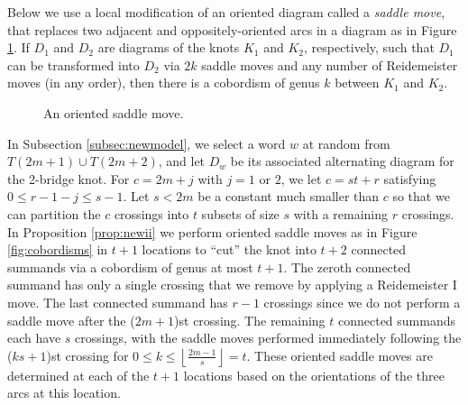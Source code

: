 \documentclass[12pt]{amsart}
\theoremstyle{definition}
\theoremstyle{remark}
\numberwithin{equation}{section}
\begin{document}
Below we use a local modification of an oriented diagram called a \textit{saddle move}, that replaces two adjacent and oppositely-oriented arcs in a diagram as in Figure \ref{fig:saddle}. If $D_1$ and $D_2$ are diagrams of the knots $K_1$ and $K_2$, respectively, such that $D_1$ can be transformed into $D_2$ via $2k$ saddle moves and any number of Reidemeister moves (in any order), then there is a cobordism of genus $k$ between $K_1$ and $K_2$.
\begin{figure}[h!]
\caption{An oriented saddle move.}
\label{fig:saddle}
\end{figure}





In Subsection \ref{subsec:newmodel}, we select a word $w$ at random from $T(2m+1)\cup T(2m+2)$, and let $D_w$ be its associated alternating diagram for the 2-bridge knot.  For $c=2m+j$ with $j=1$ or $2$, we let $c=st+r$ satisfying $0\leq r-1-j\leq s-1$.  Let $s<2m$ be a constant much smaller than $c$ so that we can partition the $c$ crossings into $t$ subsets of size $s$ with a remaining $r$ crossings.  In Proposition \ref{prop:newii} we perform oriented saddle moves as in Figure \ref{fig:cobordisms} in $t+1$ locations to ``cut'' the knot into $t+2$ connected summands via a cobordism of genus at most $t+1$.  The zeroth connected summand has only a single crossing that we remove by applying a Reidemeister I move. The last connected summand has $r-1$ crossings since we do not perform a saddle move after the ($2m+1$)st crossing.  The remaining $t$ connected summands each have $s$ crossings, with the saddle moves performed immediately following the ($ks+1$)st crossing for $0\leq k \leq \left\lfloor\frac{2m-1}{s}\right\rfloor=t$.  These oriented saddle moves are determined at each of the $t+1$ locations based on the orientations of the three arcs at this location.
\end{document}
